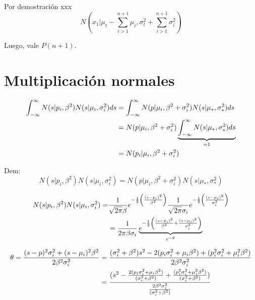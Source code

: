 \documentclass[11pt,twoside,spanish]{report} %
\begin{document}
Por demostraci\'on xxx%
\begin{equation}
	N\left(x_1|\mu_t-\sum_{i>1}^{n+1} \mu_i,\sigma_t^2+\sum_{i>1}^{n+1}\sigma_i^2\right)
\end{equation}

Luego, vale $P(n+1)$.


\section{Multiplicaci\'on normales}

\begin{equation}
	\centering
	\begin{split}
		\int_{-\infty}^{\infty} N(s \vert p_i,\beta^2) N(s \vert \mu_i,\sigma_i^2)ds
		& = \int_{-\infty}^{\infty} N(p \vert \mu_i,\beta^2+\sigma_i^2) N(s \vert \mu_{\ast},\sigma_{\ast}^2)ds \\
		& = N(p \vert \mu_i,\beta^2+\sigma_i^2) \underbrace{\int_{-\infty}^{\infty}  N(s \vert \mu_{\ast},\sigma_{\ast}^2)ds}_{=1} \\
		& =  N(p_i \vert \mu_i,\beta^2+\sigma_i^2)
	\end{split}
\end{equation}

Dem:
\begin{equation}N(s \vert p_i,\beta^2) N(s \vert \mu_i,\sigma_i^2) = N(p \vert \mu_i,\beta^2+\sigma_i^2) N(s \vert \mu_{\ast},\sigma_{\ast}^2)
\end{equation}

\begin{equation}
	\centering
	\begin{split}
		N(s \vert p_i,\beta^2) N(s \vert \mu_i,\sigma_i^2) =
		& \frac{1}{\sqrt{2\pi} \beta}e^{-\frac{1}{2}\left(\frac{(s-p_i)^2}{\beta^2}\right)}\frac{1}{\sqrt{2\pi} \sigma_i}e^{-\frac{1}{2}\left(\frac{(s-\mu_i)^2}{\sigma_i^2}\right)} \\
		& = \frac{1}{2\pi\beta\sigma_i}\underbrace{e^{-\frac{1}{2}\left(\frac{(s-p_i)^2}{\beta^2}+\frac{(s-\mu_i)^2}{\sigma_i^2}\right)}}_{e^{-\theta}}
	\end{split}
\end{equation}

\begin{equation}
	\centering
	\begin{split}
		\theta = \frac{(s-p)^2\sigma_{i}^2+(s-\mu_i)^2\beta^2}{2\beta^2\sigma_i^2}
		& = \frac{(\sigma_i^2+\beta^2)s^2-2(p_i\sigma_i^2+\mu_i\beta^2)+(p_i^2\sigma_{i}^2+\mu_{i}^2\beta^2)}{2\beta^2\sigma_{i}^2} \\
		& =\frac{(s^2-\frac{2(p_i\sigma_{i}^2+\mu_i\beta^2)}{(\sigma_{i}^2+\beta^2)}+\frac{(p_{i}^2\sigma_{i}^2+\mu_{i}^2\beta^2)}{(\sigma_i^2+\beta^2)})}{\frac{2\beta^2\sigma_{i}^2}{(\sigma_{i}^2+\beta^2)}}
	\end{split}
\end{equation}
\end{document}
